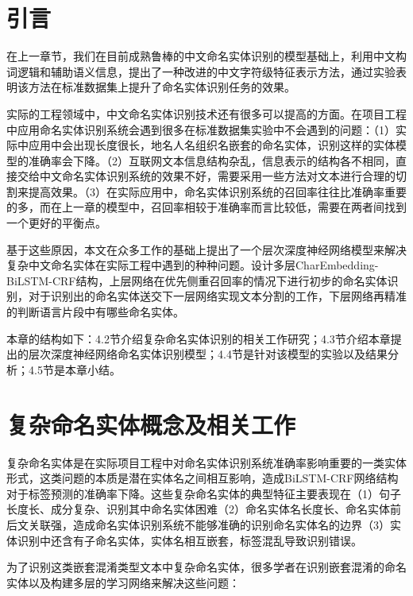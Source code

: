 \documentclass[winfonts,master,oneside,nobackinfo]{njuthesis}
\begin{document}
\section{引言}

在上一章节，我们在目前成熟鲁棒的中文命名实体识别的模型基础上，利用中文构词逻辑和辅助语义信息，提出了一种改进的中文字符级特征表示方法，通过实验表明该方法在标准数据集上提升了命名实体识别任务的效果。

实际的工程领域中，中文命名实体识别技术还有很多可以提高的方面。在项目工程中应用命名实体识别系统会遇到很多在标准数据集实验中不会遇到的问题：（1）实际中应用中会出现长度很长，地名人名组织名嵌套的命名实体，识别这样的实体模型的准确率会下降。（2）互联网文本信息结构杂乱，信息表示的结构各不相同，直接交给中文命名实体识别系统的效果不好，需要采用一些方法对文本进行合理的切割来提高效果。（3）在实际应用中，命名实体识别系统的召回率往往比准确率重要的多，而在上一章的模型中，召回率相较于准确率而言比较低，需要在两者间找到一个更好的平衡点。

基于这些原因，本文在众多工作的基础上提出了一个层次深度神经网络模型来解决复杂中文命名实体在实际工程中遇到的种种问题。设计多层CharEmbedding-BiLSTM-CRF结构，上层网络在优先侧重召回率的情况下进行初步的命名实体识别，对于识别出的命名实体送交下一层网络实现文本分割的工作，下层网络再精准的判断语言片段中有哪些命名实体。

本章的结构如下：4.2节介绍复杂命名实体识别的相关工作研究；4.3节介绍本章提出的层次深度神经网络命名实体识别模型；4.4节是针对该模型的实验以及结果分析；4.5节是本章小结。





\section{复杂命名实体概念及相关工作}

复杂命名实体是在实际项目工程中对命名实体识别系统准确率影响重要的一类实体形式，这类问题的本质是潜在实体名之间相互影响，造成BiLSTM-CRF网络结构对于标签预测的准确率下降。这些复杂命名实体的典型特征主要表现在（1）句子长度长、成分复杂、识别其中命名实体困难（2）命名实体名长度长、命名实体前后文关联强，造成命名实体识别系统不能够准确的识别命名实体名的边界（3）实体识别中还含有子命名实体，实体名相互嵌套，标签混乱导致识别错误。

为了识别这类嵌套混淆类型文本中复杂命名实体，很多学者在识别嵌套混淆的命名实体以及构建多层的学习网络来解决这些问题：
\end{document}
